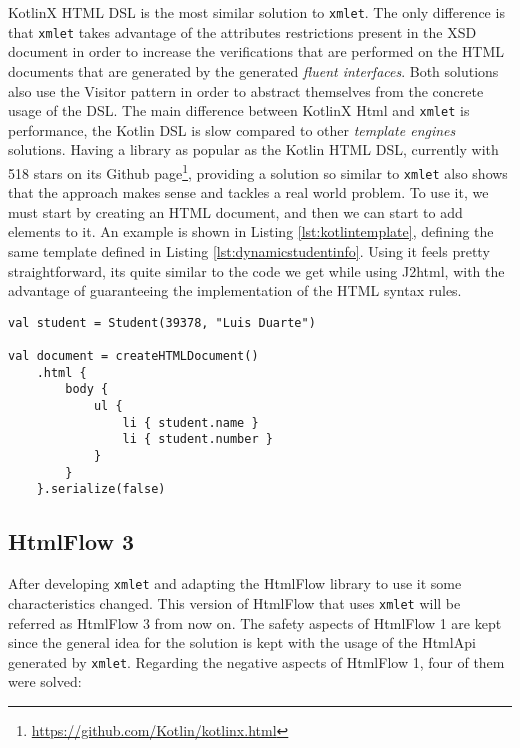 \noindent
KotlinX\cite{kotlinx} \ac{HTML} \ac{DSL} is the most similar solution to \texttt{xmlet}. The only difference is that \texttt{xmlet} takes advantage of the attributes restrictions present in the \ac{XSD} document in order to increase the verifications that are performed on the \ac{HTML} documents that are generated by the generated \textit{fluent interfaces}. Both solutions also use the Visitor pattern in order to abstract themselves from the concrete usage of the \ac{DSL}. The main difference between KotlinX Html and \texttt{xmlet} is performance, the Kotlin \ac{DSL} is slow compared to other \textit{template engines} solutions. Having a library as popular as the Kotlin \ac{HTML} \ac{DSL}, currently with 518 stars on its Github page\footnote{\url{https://github.com/Kotlin/kotlinx.html}}, providing a solution so similar to \texttt{xmlet} also shows that the approach makes sense and tackles a real world problem. To use it, we must start by creating an \ac{HTML} document, and then we can start to add elements to it. An example is shown in Listing \ref{lst:kotlintemplate}, defining the same template defined in Listing \ref{lst:dynamicstudentinfo}. Using it feels pretty straightforward, its quite similar to the code we get while using J2html, with the advantage of guaranteeing the implementation of the \ac{HTML} syntax rules. 

\bigskip


\begin{minipage}{\linewidth}
\begin{lstlisting}[caption={Kotlin Template Example}, label={lst:kotlintemplate}]
val student = Student(39378, "Luis Duarte")

val document = createHTMLDocument()
    .html {
        body {
            ul {
                li { student.name }
                li { student.number }
            }
        }
    }.serialize(false)
\end{lstlisting}
\end{minipage}

\newpage

\subsection{HtmlFlow 3}
\label{sec:htmlflowwithxmlet}

After developing \texttt{xmlet} and adapting the HtmlFlow library to use it some characteristics changed. This version of HtmlFlow that uses \texttt{xmlet} will be referred as HtmlFlow 3 from now on. The safety aspects of HtmlFlow 1 are kept since the general idea for the solution is kept with the usage of the HtmlApi generated by \texttt{xmlet}. Regarding the negative aspects of HtmlFlow 1, four of them were solved:

